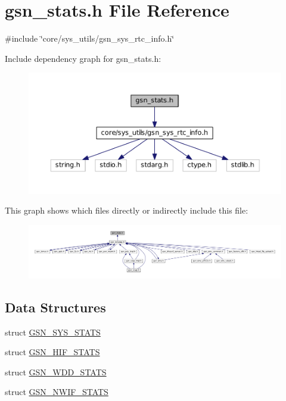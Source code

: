 \hypertarget{a00591}{
\section{gsn\_\-stats.h File Reference}
\label{a00591}
}
{\ttfamily \#include \char`\"{}core/sys\_\-utils/gsn\_\-sys\_\-rtc\_\-info.h\char`\"{}}\par
Include dependency graph for gsn\_\-stats.h:
\nopagebreak
\begin{figure}[H]
\begin{center}
\leavevmode
\includegraphics[width=400pt]{a00834}
\end{center}
\end{figure}
This graph shows which files directly or indirectly include this file:
\nopagebreak
\begin{figure}[H]
\begin{center}
\leavevmode
\includegraphics[width=400pt]{a00835}
\end{center}
\end{figure}
\subsection*{Data Structures}
\begin{DoxyCompactItemize}
\item 
struct \hyperlink{a00260}{GSN\_\-SYS\_\-STATS}
\item 
struct \hyperlink{a00092}{GSN\_\-HIF\_\-STATS}
\item 
struct \hyperlink{a00301}{GSN\_\-WDD\_\-STATS}
\item 
struct \hyperlink{a00176}{GSN\_\-NWIF\_\-STATS}
\end{DoxyCompactItemize}
